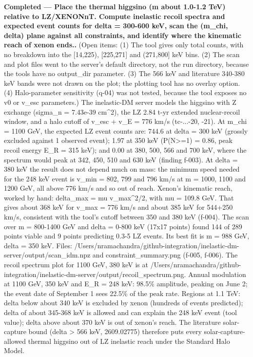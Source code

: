 \documentclass[11pt,a4paper]{article}
\begin{document}
\textbf{Completed --- Place the thermal higgsino (m about 1.0-1.2 TeV) relative to LZ/XENONnT. Compute inelastic recoil spectra and expected event counts for delta = 300-600 keV, scan the (m\_chi, delta) plane against all constraints, and identify where the kinematic reach of xenon ends..} (Open items: (1) The tool gives only total counts, with no breakdown into the [14,225), [225,271] and (271,800] keV bins. (2) The scan and plot files went to the server's default directory, not the run directory, because the tools have no output\_dir parameter. (3) The 566 keV and literature 340-380 keV bands were not drawn on the plot; the plotting tool has no overlay option. (4) Halo-parameter sensitivity (q-04) was not tested, because the tool exposes no v0 or v\_esc parameters.) The inelastic-DM server models the higgsino with Z exchange (sigma\_n = 7.43e-39 cm\textasciicircum{}2), the LZ 2.84 t-yr extended nuclear-recoil window, and a halo cutoff of v\_esc + v\_E = 776 km/s (tc-...-20, -21). At m\_chi = 1100 GeV, the expected LZ event counts are: 744.6 at delta = 300 keV (grossly excluded against 1 observed event); 1.97 at 350 keV (P(N\textgreater{}=1) = 0.86, peak recoil energy E\_R = 315 keV); and 0.00 at 380, 500, 566 and 700 keV, where the spectrum would peak at 342, 450, 510 and 630 keV (finding f-003). At delta = 380 keV the result does not depend much on mass: the minimum speed needed for the 248 keV event is v\_min = 802, 799 and 796 km/s at m = 1000, 1100 and 1200 GeV, all above 776 km/s and so out of reach. Xenon's kinematic reach, worked by hand: delta\_max = mu v\_max\textasciicircum{}2/2, with mu = 109.8 GeV. That gives about 368 keV for v\_max = 776 km/s and about 385 keV for 544+250 km/s, consistent with the tool's cutoff between 350 and 380 keV (f-004). The scan over m = 800-1400 GeV and delta = 0-800 keV (17x17 points) found 144 of 289 points viable and 9 points predicting 0.3-5 LZ events. Its best fit is m = 988 GeV, delta = 350 keV. Files: /Users/nramachandra/github-integration/inelastic-dm-server/output/scan\_idm.npz and constraint\_summary.png (f-005, f-006). The recoil spectrum plot for 1100 GeV, 380 keV is at /Users/nramachandra/github-integration/inelastic-dm-server/output/recoil\_spectrum.png. Annual modulation at 1100 GeV, 350 keV and E\_R = 248 keV: 98.5\% amplitude, peaking on June 2; the event date of September 1 sees 22.5\% of the peak rate. Regions at 1.1 TeV: delta below about 340 keV is excluded by xenon (hundreds of events predicted); delta of about 345-368 keV is allowed and can explain the 248 keV event (tool value); delta above about 370 keV is out of xenon's reach. The literature solar-capture bound (delta \textgreater{} 566 keV, 2609.02775) therefore puts every solar-capture-allowed thermal higgsino out of LZ inelastic reach under the Standard Halo Model.
\end{document}
